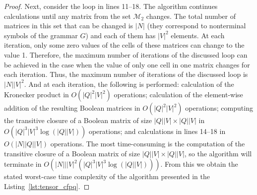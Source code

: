 \begin{proof}
Next, consider the loop in lines 11--18. The algorithm continues calculations until any matrix from the set $\mathcal{M}_2$ changes. The total number of matrices in this set that can be changed is $|N|$ (they correspond to nonterminal symbols of the grammar $G$) and each of them has $|V|^2$ elements. At each iteration, only some zero values of the cells of these matrices can change to the value 1. Therefore, the maximum number of iterations of the discussed loop can be achieved in the case when the value of only one cell in one matrix changes for each iteration. Thus, the maximum number of iterations of the discussed loop is $|N||V|^2$. And at each iteration, the following is performed: calculation of the Kronecker product in $O(|Q|^2|V|^2)$ operations; calculation of the element-wise addition of the resulting Boolean matrices in $O(|Q|^2|V|^2)$ operations; computing the transitive closure of a Boolean matrix of size $|Q||V| \times |Q||V|$ in $O(|Q|^3|V|^3 \log (|Q||V|))$ operations; and calculations in lines 14--18 in $O(|N||Q||V|)$ operations. The most time-consuming is the computation of the transitive closure of a Boolean matrix of size $|Q||V| \times |Q||V|$, so the algorithm will terminate in $O(|N|||V|^2 (|Q|^3|V|^3 \log (|Q||V|)))$. From this we obtain the stated worst-case time complexity of the algorithm presented in the Listing~\ref{lst:tensor_cfpq}.
\end{proof}

